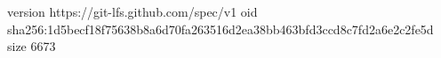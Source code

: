 version https://git-lfs.github.com/spec/v1
oid sha256:1d5becf18f75638b8a6d70fa263516d2ea38bb463bfd3ccd8c7fd2a6e2c2fe5d
size 6673

